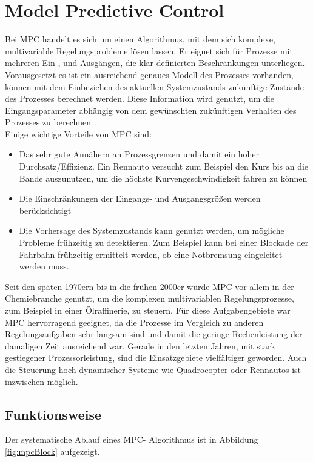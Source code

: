 \documentclass{like}
\begin{document}
\section{Model Predictive Control}
\label{MPC}
Bei \ac{MPC} handelt es sich um einen Algorithmus, mit dem sich komplexe, multivariable Regelungsprobleme lösen lassen. Er eignet sich für Prozesse mit mehreren Ein-, und Ausgängen, die klar definierten Beschränkungen unterliegen. Vorausgesetzt es ist ein ausreichend genaues Modell des Prozesses vorhanden, können mit dem Einbeziehen des aktuellen Systemzustands zukünftige Zustände des Prozesses berechnet werden. Diese Information wird genutzt, um die Eingangsparameter abhängig von dem gewünschten zukünftigen Verhalten des Prozesses zu berechnen \cite{seborg2010process}. \\
Einige wichtige Vorteile von \ac{MPC} sind: 
\begin{itemize}
	\item Das sehr gute Annähern an Prozessgrenzen und damit ein hoher Durchsatz/Effizienz. Ein Rennauto versucht zum Beispiel den Kurs bis an die Bande auszunutzen, um die höchste Kurvengeschwindigkeit fahren zu können
	\item Die Einschränkungen der Eingangs- und Ausgangsgrößen werden berücksichtigt
	\item Die Vorhersage des Systemzustands kann genutzt werden, um mögliche Probleme frühzeitig zu detektieren. Zum Beispiel kann bei einer Blockade der Fahrbahn frühzeitig ermittelt werden, ob eine Notbremsung eingeleitet werden muss.
\end{itemize}
Seit den späten 1970ern bis in die frühen 2000er wurde \ac{MPC} vor allem in der Chemiebranche genutzt, um die komplexen multivariablen Regelungsprozesse, zum Beispiel in einer Ölraffinerie, zu steuern. Für diese Aufgabengebiete war \ac{MPC} hervorragend geeignet, da die Prozesse im Vergleich zu anderen Regelungsaufgaben sehr langsam sind und damit die geringe Rechenleistung der damaligen Zeit ausreichend war. 
Gerade in den letzten Jahren, mit stark gestiegener Prozessorleistung, sind die Einsatzgebiete vielfältiger geworden. Auch die Steuerung hoch dynamischer Systeme wie Quadrocopter \cite{quadcopterMpc} oder Rennautos \cite{carMPC} ist inzwischen möglich. 

\subsection*{Funktionsweise}
Der systematische Ablauf eines \ac{MPC}- Algorithmus ist in Abbildung \ref{fig:mpcBlock} aufgezeigt.  
\end{document}
